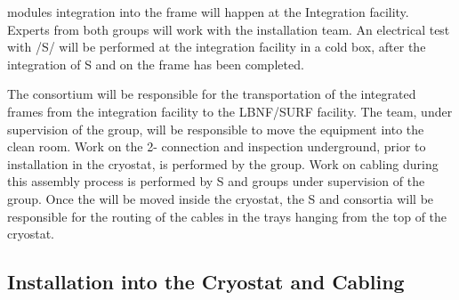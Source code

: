 

 modules integration into the  frame will happen at the Integration facility. Experts from both groups will work with the installation team. 
An electrical test with /S/ will be performed at the integration facility in a cold box, after the integration of S and  on the  frame has been completed.

The  consortium will be responsible for the transportation of the integrated  frames from the integration facility to the LBNF/SURF facility. 
The  team, under supervision of the  group, will be responsible to move the equipment into the clean room. 
Work on the 2- connection and inspection underground, prior to installation in the cryostat, is performed by the  group.
Work on cabling during this assembly process is performed by S and  groups under supervision of the  group.
Once the  will be moved inside the cryostat, the S and  consortia will be responsible for the routing of the cables in the trays hanging from the top of the cryostat. 


\subsection{Installation into the Cryostat and Cabling}
\label{sec:fdsp-pd-install-pd-cryo}

